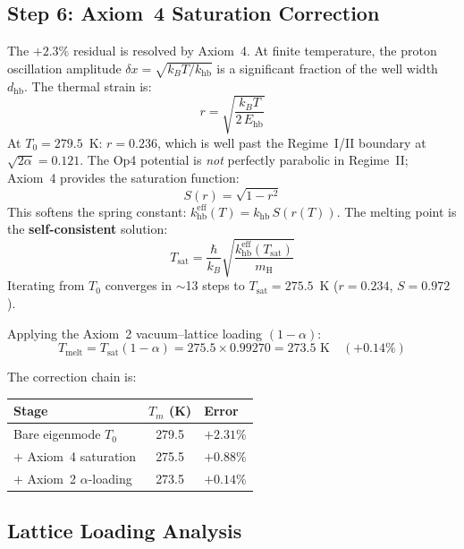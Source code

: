 \subsection{Step 6: Axiom~4 Saturation Correction}

The $+2.3\%$ residual is resolved by Axiom~4. At finite temperature, the proton oscillation amplitude $\delta x = \sqrt{k_B T / k_\text{hb}}$ is a significant fraction of the well width $d_\text{hb}$. The thermal strain is:
\begin{equation}
  r = \sqrt{\frac{k_B T}{2\,E_\text{hb}}}
\end{equation}
At $T_0 = 279.5$~K: $r = 0.236$, which is well past the Regime~I/II boundary at $\sqrt{2\alpha} = 0.121$. The Op4 potential is \emph{not} perfectly parabolic in Regime~II; Axiom~4 provides the saturation function:
\begin{equation}
  S(r) = \sqrt{1 - r^2}
\end{equation}
This softens the spring constant: $k_\text{hb}^\text{eff}(T) = k_\text{hb}\,S(r(T))$. The melting point is the \textbf{self-consistent} solution:
\begin{equation}
  T_\text{sat} = \frac{\hbar}{k_B}\sqrt{\frac{k_\text{hb}^\text{eff}(T_\text{sat})}{m_\text{H}}}
\end{equation}
Iterating from $T_0$ converges in $\sim$13 steps to $T_\text{sat} = 275.5$~K ($r = 0.234$, $S = 0.972$).

Applying the Axiom~2 vacuum--lattice loading $(1-\alpha)$:
\begin{equation}
\boxed{
  T_\text{melt} = T_\text{sat}(1-\alpha) = 275.5 \times 0.99270 = 273.5 \text{ K} \quad (+0.14\%)
}
\end{equation}

The correction chain is:
\begin{center}
\small
\renewcommand{\arraystretch}{1.2}
\begin{tabularx}{\textwidth}{@{}lcX@{}}
\toprule
\textbf{Stage} & \textbf{$T_m$ (K)} & \textbf{Error} \\
\midrule
Bare eigenmode $T_0$ & 279.5 & $+2.31\%$ \\
$+$ Axiom~4 saturation & 275.5 & $+0.88\%$ \\
$+$ Axiom~2 $\alpha$-loading & 273.5 & $+0.14\%$ \\
\bottomrule
\end{tabularx}
\end{center}

\subsection{Lattice Loading Analysis}

